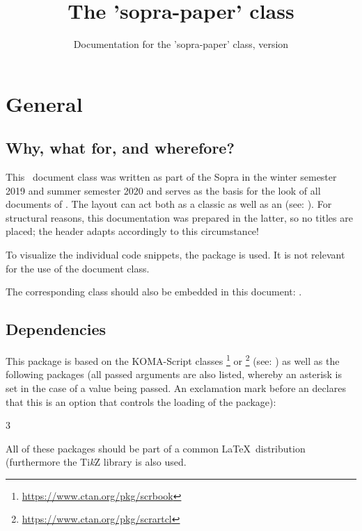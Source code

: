 \documentclass[useartcl,notoc]{sopra-paper}
\title{The 'sopra-paper' class}
\subtitle[Documentation for the 'sopra-paper' class]{Documentation for the 'sopra-paper' class, version \thesopversion}
\begin{document}
\section{General}
\subsection{Why, what for, and wherefore?}
    This \LaTeXe\ document class was written as part of the Sopra in the
    winter semester 2019 and summer semester 2020 and serves as the
    basis for the look of all documents of .
    The layout can act both as a classic  as well as an  (see: ). For structural reasons, this documentation was prepared in the latter, so no titles are placed; the header adapts accordingly to this circumstance!\par
    To visualize the individual code snippets, the
     package is used. It is not relevant
    for the use of the document class.\par
    The corresponding class should also be embedded in this document: .
\subsection{Dependencies}
    This package is based on the KOMA-Script classes \footnote{\url{https://www.ctan.org/pkg/scrbook}} or \footnote{\url{https://www.ctan.org/pkg/scrartcl}} (see: )
    as well as the following packages (all passed arguments are also
    listed, whereby an asterisk is set in the case of a value being passed. An exclamation mark before an  declares that this is an option that controls the loading of the package):
    \begin{multicols}{3}
    \end{multicols}
    All of these packages should be part of a common \LaTeX\ distribution (furthermore
    the Ti\textit{k}Z library  is also used.
\end{document}
